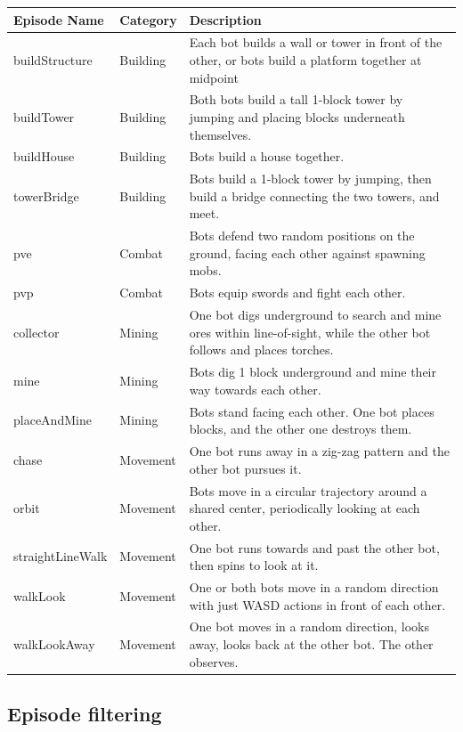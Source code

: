 \begin{table}[h]
\begin{tabularx}{\linewidth}{llY}
\toprule
\textbf{Episode Name} & \textbf{Category} & \textbf{Description} \\
\midrule
buildStructure & Building & Each bot builds a wall or tower in front of the other, or bots build a platform together at midpoint \\
buildTower & Building & Both bots build a tall 1-block tower by jumping and placing blocks underneath themselves. \\
buildHouse & Building & Bots build a house together. \\
towerBridge & Building & Bots build a 1-block tower by jumping, then build a bridge connecting the two towers, and meet. \\
pve & Combat & Bots defend two random positions on the ground, facing each other against spawning mobs. \\
pvp & Combat & Bots equip swords and fight each other. \\
collector & Mining & One bot digs underground to search and mine ores within line-of-sight, while the other bot follows and places torches. \\
mine & Mining & Bots dig 1 block underground and mine their way towards each other. \\
placeAndMine & Mining & Bots stand facing each other. One bot places blocks, and the other one destroys them. \\
chase & Movement & One bot runs away in a zig-zag pattern and the other bot pursues it. \\
orbit & Movement & Bots move in a circular trajectory around a shared center, periodically looking at each other. \\
straightLineWalk & Movement & One bot runs towards and past the other bot, then spins to look at it. \\
walkLook & Movement & One or both bots move in a random direction with just WASD actions in front of each other. \\
walkLookAway & Movement & One bot moves in a random direction, looks away, looks back at the other bot. The other observes. \\
\bottomrule
\end{tabularx}
\end{table}



\subsection{Episode filtering}

